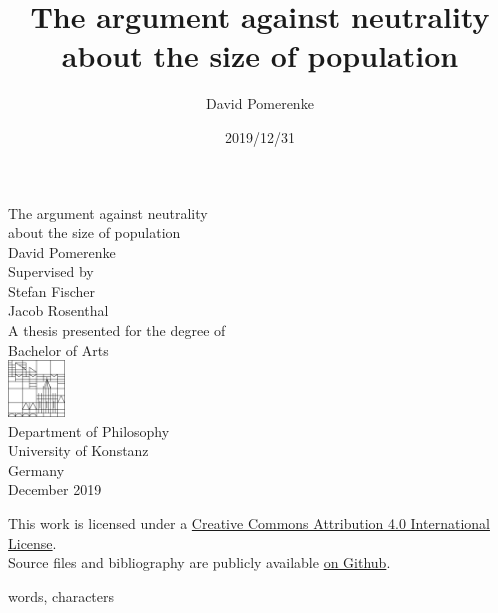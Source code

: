 \documentclass{report}
\title{The argument against neutrality about the size of population}
\author{David Pomerenke}
\date{2019/12/31}
\begin{document}
\begin{titlepage}
    \begin{center}
        \huge
        The argument against neutrality\\
        about the size of population\\
        \vspace*{1cm}
        \large
        David Pomerenke\\
        \vfill
        Supervised by\\
        Stefan Fischer\\
        Jacob Rosenthal\\
        \vfill
        A thesis presented for the degree of\\
        Bachelor of Arts\\
        \vfill
        \includegraphics[width=1.5cm]{0-logo.png}\\
        Department of Philosophy\\
        University of Konstanz\\
        Germany\\
        December 2019\\
    \end{center}
\end{titlepage}

\tableofcontents
\vfill

\begin{center}
    \footnotesize
    This work is licensed under a \href{http://creativecommons.org/licenses/by/4.0/}{Creative Commons Attribution 4.0 International License}. \\
    Source files and bibliography are publicly available \href{https://github.com/davidpomerenke/ba}{on Github}.
\end{center}









 words,
 characters



\end{document}
